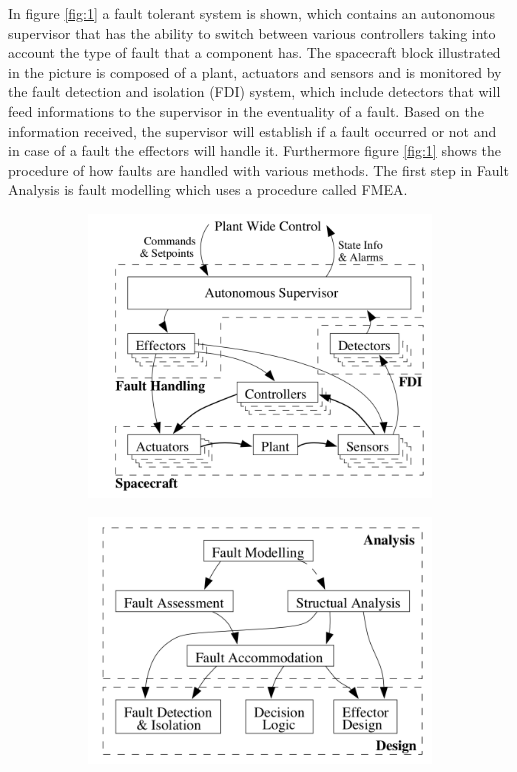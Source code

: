In figure \ref{fig:1} a fault tolerant system is shown, which contains an autonomous supervisor that has the ability to switch between various controllers taking into account the type of fault that a component has. The spacecraft block illustrated in the picture is composed of a plant, actuators and sensors and is monitored by the fault detection and isolation (FDI) system, which include detectors that will feed informations to the supervisor in the eventuality of a fault. Based on the information received, the supervisor will establish if a fault occurred or not and in case of a fault the effectors will handle it. Furthermore figure \ref{fig:1} shows the procedure of how faults are handled with various methods. The first step in Fault Analysis is fault modelling which uses a procedure called FMEA.
\begin{figure}[H]
	\begin{minipage}[b]{0.49\linewidth}
		\centering
		\begin{figure}[H]
			\centering
			\includegraphics[width=1\linewidth]{figures/FTC}
		\end{figure}
	\end{minipage}\hfill
	\begin{minipage}[b]{0.49\linewidth}
		\centering
		\begin{figure}[H]
			\centering
			\includegraphics[width=1\linewidth]{figures/FTC_2}

\end{figure}
\end{minipage}
\end{figure}
